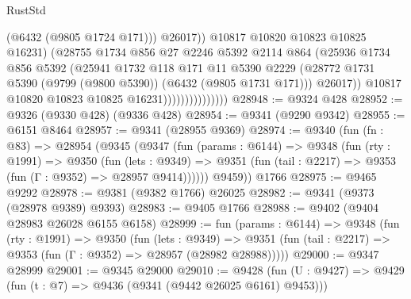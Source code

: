 \begin{lexlean}{RustStd}
\begin{coremodule}
                                        (@6432 (@9805 @1724 @171)))
                                      @26017))
                                  @10817
                                  @10820
                                  @10823
                                  @10825
                                  @16231)
                                (@28755
                                  @1734
                                  @856
                                  @27
                                  @2246
                                  @5392
                                  @2114
                                  @864
                                  (@25936
                                    @1734
                                    @856
                                    @5392
                                    (@25941
                                      @1732
                                      @118
                                      @171
                                      @11
                                      @5390
                                      @2229
                                      (@28772
                                        @1731
                                        @5390
                                        (@9799 (@9800 @5390))
                                        (@6432 (@9805 @1731 @171)))
                                      @26017))
                                  @10817
                                  @10820
                                  @10823
                                  @10825
                                  @16231)))))))))))))))
@28948 := @9324 @428
@28952 := @9326 (@9330 @428) (@9336 @428)
@28954 := @9341 (@9290 @9342)
@28955 := @6151 @8464
@28957 := @9341 (@28955 @9369)
@28974 := @9340
    (fun (fn : @83) =>
    @28954
      (@9345
        (@9347
          (fun (params : @6144) =>
          @9348
            (fun (rty : @1991) =>
            @9350
              (fun (lets : @9349) =>
              @9351 (fun (tail : @2217) => @9353 (fun (Γ : @9352) => @28957 @9414))))))
        @9459))
    @1766
@28975 := @9465 @9292
@28978 := @9381 (@9382 @1766) @26025
@28982 := @9341 (@9373 (@28978 @9389) @9393)
@28983 := @9405 @1766
@28988 := @9402 (@9404 @28983 @26028 @6155 @6158)
@28999 := fun (params : @6144) =>
  @9348
    (fun (rty : @1991) =>
    @9350
      (fun (lets : @9349) =>
      @9351 (fun (tail : @2217) => @9353 (fun (Γ : @9352) => @28957 (@28982 @28988)))))
@29000 := @9347 @28999
@29001 := @9345 @29000
@29010 := @9428
    (fun (U : @9427) => @9429 (fun (t : @7) => @9436 (@9341 (@9442 @26025 @6161) @9453)))

\end{coremodule}
\end{lexlean}
